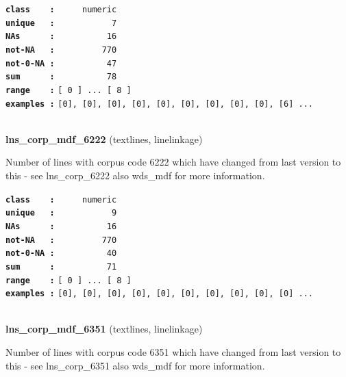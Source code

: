 \documentclass[]{article}
\begin{document}
\textbf{\texttt{class\ \ \ \ :}} \texttt{~~~~~numeric}\\
\textbf{\texttt{unique\ \ \ :}} \texttt{~~~~~~~~~~~7}\\
\textbf{\texttt{NAs\ \ \ \ \ \ :}} \texttt{~~~~~~~~~~16}\\
\textbf{\texttt{not-NA\ \ \ :}} \texttt{~~~~~~~~~770}\\
\textbf{\texttt{not-0-NA\ :}} \texttt{~~~~~~~~~~47}\\
\textbf{\texttt{sum\ \ \ \ \ \ :}} \texttt{~~~~~~~~~~78}\\
\textbf{\texttt{range\ \ \ \ :}}
\texttt{{[}\ 0\ {]}\ ...\ {[}\ 8\ {]}}\\
\textbf{\texttt{examples\ :}}
\texttt{{[}0{]},\ {[}0{]},\ {[}0{]},\ {[}0{]},\ {[}0{]},\ {[}0{]},\ {[}0{]},\ {[}0{]},\ {[}0{]},\ {[}6{]}\ ...}\\

~

\textbf{lns\_corp\_mdf\_6222} (textlines, linelinkage)

Number of lines with corpus code 6222 which have changed from last
version to this - see lns\_corp\_6222 also wds\_mdf for more
information.

\textbf{\texttt{class\ \ \ \ :}} \texttt{~~~~~numeric}\\
\textbf{\texttt{unique\ \ \ :}} \texttt{~~~~~~~~~~~9}\\
\textbf{\texttt{NAs\ \ \ \ \ \ :}} \texttt{~~~~~~~~~~16}\\
\textbf{\texttt{not-NA\ \ \ :}} \texttt{~~~~~~~~~770}\\
\textbf{\texttt{not-0-NA\ :}} \texttt{~~~~~~~~~~40}\\
\textbf{\texttt{sum\ \ \ \ \ \ :}} \texttt{~~~~~~~~~~71}\\
\textbf{\texttt{range\ \ \ \ :}}
\texttt{{[}\ 0\ {]}\ ...\ {[}\ 8\ {]}}\\
\textbf{\texttt{examples\ :}}
\texttt{{[}0{]},\ {[}0{]},\ {[}0{]},\ {[}0{]},\ {[}0{]},\ {[}0{]},\ {[}0{]},\ {[}0{]},\ {[}0{]},\ {[}0{]}\ ...}\\

~

\textbf{lns\_corp\_mdf\_6351} (textlines, linelinkage)

Number of lines with corpus code 6351 which have changed from last
version to this - see lns\_corp\_6351 also wds\_mdf for more
information.
\end{document}
